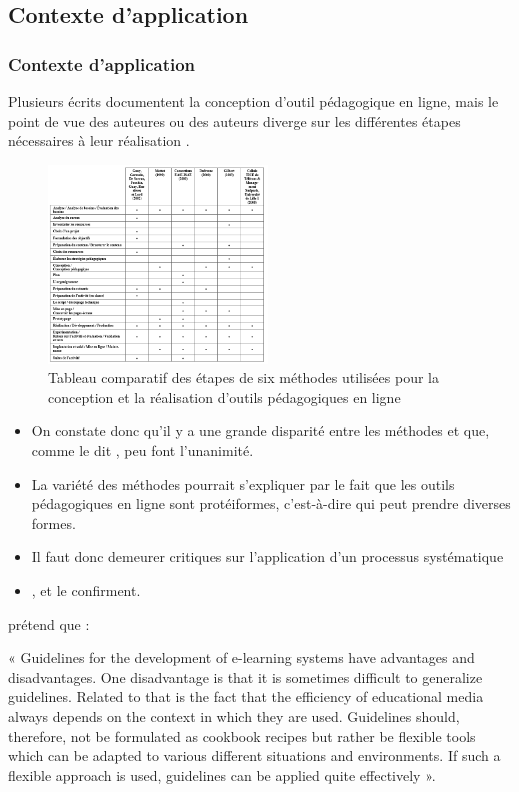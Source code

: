   \subsection{Contexte d'application} 
		\begin{frame}[allowframebreaks]
			\frametitle{Contexte d'application}
			Plusieurs écrits documentent la conception d’outil pédagogique en ligne, mais le point de vue des auteures ou des auteurs diverge sur les différentes étapes nécessaires à leur réalisation \citep[p.18]{bonneau2013a}.
                   \begin{figure}
                     \centering
                     \includegraphics[width = 0.52\textwidth]{tableau6methodes.png}
                     \caption{\tiny{Tableau comparatif des étapes de six méthodes utilisées pour la conception et la réalisation d’outils pédagogiques en ligne \citep[p.20]{bonneau2013a}}}
                   \end{figure}
                   \begin{itemize}                   
                   \item On constate donc qu’il y a une grande disparité entre les méthodes et que, comme le dit \citet{bonneau2013a} , peu font l’unanimité. 
                   \item La variété des méthodes pourrait s’expliquer par le fait que les outils pédagogiques en ligne sont protéiformes, c’est-à-dire qui peut prendre diverses formes.
                   \item Il faut donc demeurer critiques sur l’application d’un processus systématique
                   \item \citet[p.10]{retalis1997a}, \citet[p.46]{smith2006a} et \citet[p.3]{pohl2004a} le confirment.
                   \end{itemize}
			\par \citet[p.3]{pohl2004a} prétend que : 
			\par« Guidelines for the development of e-learning systems have advantages and disadvantages. One disadvantage is that it is sometimes difficult to generalize guidelines. Related to that is the fact that the efficiency of educational media always depends on the context in which they are used. Guidelines should, therefore, not be formulated as cookbook recipes but rather be flexible tools which can be adapted to various different situations and environments. If such a flexible approach is used, guidelines can be applied quite effectively ».

\end{frame}
